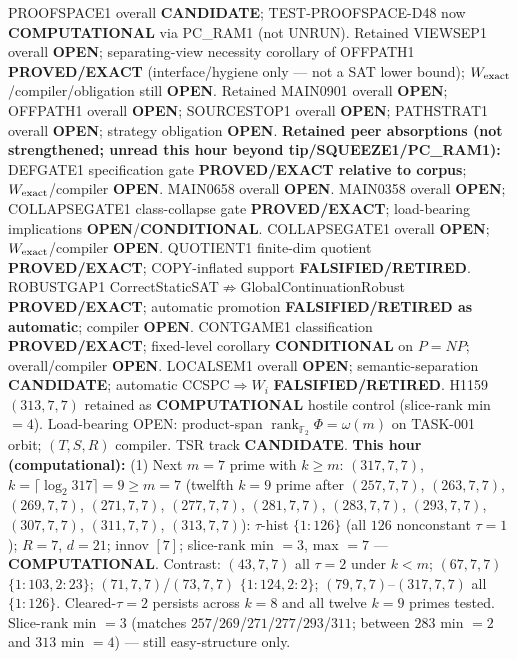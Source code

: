\documentclass[11pt]{article}
\begin{document}
PROOFSPACE1 overall \textbf{CANDIDATE}; TEST-PROOFSPACE-D48 now \textbf{COMPUTATIONAL} via PC\_RAM1
(not UNRUN).
Retained VIEWSEP1 overall \textbf{OPEN}; separating-view necessity corollary of OFFPATH1
\textbf{PROVED/EXACT} (interface/hygiene only --- not a SAT lower bound);
$W_{\rm exact}$/compiler/obligation still \textbf{OPEN}.
Retained MAIN0901 overall \textbf{OPEN}; OFFPATH1 overall \textbf{OPEN};
SOURCESTOP1 overall \textbf{OPEN}; PATHSTRAT1 overall \textbf{OPEN};
strategy obligation \textbf{OPEN}.
\textbf{Retained peer absorptions (not strengthened; unread this hour beyond tip/SQUEEZE1/PC\_RAM1):}
DEFGATE1 specification gate \textbf{PROVED/EXACT relative to corpus};
$W_{\rm exact}$/compiler \textbf{OPEN}.
MAIN0658 overall \textbf{OPEN}.
MAIN0358 overall \textbf{OPEN}; COLLAPSEGATE1 class-collapse gate \textbf{PROVED/EXACT};
load-bearing implications \textbf{OPEN}/\textbf{CONDITIONAL}.
COLLAPSEGATE1 overall \textbf{OPEN}; $W_{\rm exact}$/compiler \textbf{OPEN}.
QUOTIENT1 finite-dim quotient \textbf{PROVED/EXACT}; COPY-inflated support \textbf{FALSIFIED/RETIRED}.
ROBUSTGAP1 CorrectStaticSAT$\not\Rightarrow$GlobalContinuationRobust \textbf{PROVED/EXACT};
automatic promotion \textbf{FALSIFIED/RETIRED as automatic}; compiler \textbf{OPEN}.
CONTGAME1 classification \textbf{PROVED/EXACT}; fixed-level corollary \textbf{CONDITIONAL} on $P=NP$;
overall/compiler \textbf{OPEN}.
LOCALSEM1 overall \textbf{OPEN}; semantic-separation \textbf{CANDIDATE}; automatic CCSPC$\Rightarrow W_i$
\textbf{FALSIFIED/RETIRED}.
H1159 $(313,7,7)$ retained as \textbf{COMPUTATIONAL} hostile control (slice-rank min $=4$).
Load-bearing OPEN: product-span $\operatorname{rank}_{\mathbb F_2}\Phi=\omega(m)$ on TASK-001 orbit;
$(T,S,R)$ compiler. TSR track \textbf{CANDIDATE}.
\textbf{This hour (computational):}
(1) Next $m{=}7$ prime with $k{\ge}m$: $(317,7,7)$, $k{=}\lceil\log_2 317\rceil=9{\ge}m{=}7$
(twelfth $k{=}9$ prime after $(257,7,7)$, $(263,7,7)$, $(269,7,7)$, $(271,7,7)$, $(277,7,7)$, $(281,7,7)$, $(283,7,7)$, $(293,7,7)$, $(307,7,7)$, $(311,7,7)$, $(313,7,7)$):
$\tau$-hist $\{1{:}126\}$ (all $126$ nonconstant $\tau{=}1$); $R{=}7$, $d{=}21$; innov $[7]$;
slice-rank min $=3$, max $=7$ --- \textbf{COMPUTATIONAL}.
Contrast: $(43,7,7)$ all $\tau{=}2$ under $k{<}m$; $(67,7,7)$ $\{1{:}103,2{:}23\}$;
$(71,7,7)$/$(73,7,7)$ $\{1{:}124,2{:}2\}$; $(79,7,7)$--$(317,7,7)$ all $\{1{:}126\}$.
Cleared-$\tau{=}2$ persists across $k{=}8$ and all twelve $k{=}9$ primes tested.
Slice-rank min $=3$ (matches $257$/$269$/$271$/$277$/$293$/$311$; between $283$ min $=2$ and $313$ min $=4$) --- still easy-structure only.
\end{document}
